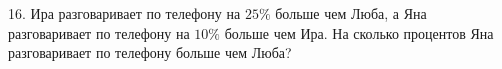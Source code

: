 16. Ира разговаривает по телефону на $25\%$ больше чем Люба, а Яна разговаривает по телефону на $10\%$ больше чем Ира. На сколько процентов Яна разговаривает по телефону больше чем Люба?\\
